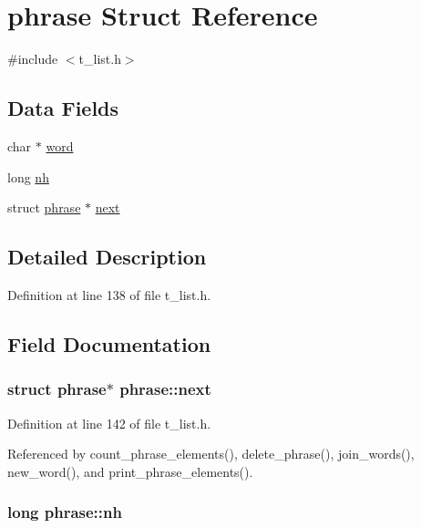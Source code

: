 \hypertarget{structphrase}{\section{phrase Struct Reference}
\label{structphrase}
}


{\ttfamily \#include $<$t\-\_\-list.\-h$>$}

\subsection*{Data Fields}
\begin{DoxyCompactItemize}
\item 
char $\ast$ \hyperlink{structphrase_a119079f5098f2cc6637854413a6bc953}{word}
\item 
long \hyperlink{structphrase_a74bd6fe65b011e6384c645ee26f3170e}{nh}
\item 
struct \hyperlink{structphrase}{phrase} $\ast$ \hyperlink{structphrase_a832e1482b5942a315ade3bb13f6dfdda}{next}
\end{DoxyCompactItemize}


\subsection{Detailed Description}


Definition at line 138 of file t\-\_\-list.\-h.



\subsection{Field Documentation}
\hypertarget{structphrase_a832e1482b5942a315ade3bb13f6dfdda}{
\subsubsection[{next}]{\setlength{\rightskip}{0pt plus 5cm}struct {\bf phrase}$\ast$ phrase\-::next}}\label{structphrase_a832e1482b5942a315ade3bb13f6dfdda}


Definition at line 142 of file t\-\_\-list.\-h.



Referenced by count\-\_\-phrase\-\_\-elements(), delete\-\_\-phrase(), join\-\_\-words(), new\-\_\-word(), and print\-\_\-phrase\-\_\-elements().

\hypertarget{structphrase_a74bd6fe65b011e6384c645ee26f3170e}{
\subsubsection[{nh}]{\setlength{\rightskip}{0pt plus 5cm}long phrase\-::nh}}\label{structphrase_a74bd6fe65b011e6384c645ee26f3170e}


